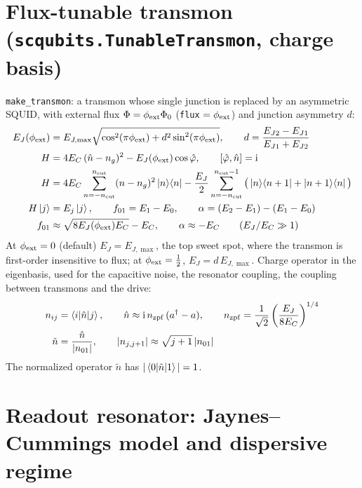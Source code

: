 \documentclass[11pt]{article}
\newcommand{\ii}{\mathrm{i}}
\newcommand{\ad}{a^{\dagger}}
\newcommand{\nq}{\tilde n}
\begin{document}
\section*{Flux-tunable transmon (\texttt{scqubits.TunableTransmon}, charge basis)}
\texttt{make\_transmon}: a transmon whose single junction is replaced by an asymmetric SQUID,
with external flux $\Phi = \phi_{\rm ext}\Phi_0$ (\texttt{flux} $=\phi_{\rm ext}$) and junction asymmetry $d$:
\begin{align}
  E_J(\phi_{\rm ext}) &= E_{J,\max}\sqrt{\cos^2(\pi\phi_{\rm ext}) + d^2\sin^2(\pi\phi_{\rm ext})},
  \qquad d = \frac{E_{J2} - E_{J1}}{E_{J1} + E_{J2}} \\
  H &= 4E_C\,(\hat n - n_g)^2 - E_J(\phi_{\rm ext}) \cos\hat\varphi, \qquad [\hat\varphi, \hat n] = \ii \\
  H &= 4E_C \sum_{n=-n_{\rm cut}}^{n_{\rm cut}} (n - n_g)^2 \ket{n}\!\bra{n}
     - \frac{E_J}{2}\sum_{n=-n_{\rm cut}}^{n_{\rm cut}-1}
       \big(\ket{n}\!\bra{n+1} + \ket{n+1}\!\bra{n}\big) \\
  H\ket{j} &= E_j\ket{j}, \qquad f_{01} = E_1 - E_0, \qquad
  \alpha = (E_2 - E_1) - (E_1 - E_0) \\
  f_{01} &\approx \sqrt{8E_J(\phi_{\rm ext})E_C} - E_C, \qquad \alpha \approx -E_C
  \qquad (E_J/E_C \gg 1)
\end{align}
At $\phi_{\rm ext} = 0$ (default) $E_J = E_{J,\max}$, the top sweet spot, where the transmon is
first-order insensitive to flux; at $\phi_{\rm ext} = \tfrac12$, $E_J = d\,E_{J,\max}$.
Charge operator in the eigenbasis, used for the capacitive noise, the resonator coupling, the
coupling between transmons and the drive:
\begin{align}
  n_{ij} &= \braket{i|\hat n|j}, \qquad
  \hat n \approx \ii\, n_{\rm zpf}\,(\ad - a), \qquad
  n_{\rm zpf} = \frac{1}{\sqrt 2}\left(\frac{E_J}{8E_C}\right)^{1/4} \\
  \nq &= \frac{\hat n}{|n_{01}|}, \qquad |n_{j,j+1}| \approx \sqrt{j+1}\,|n_{01}|
\end{align}
The normalized operator $\nq$ has $|\braket{0|\nq|1}| = 1$.

\section*{Readout resonator: Jaynes--Cummings model and dispersive regime}
\end{document}
